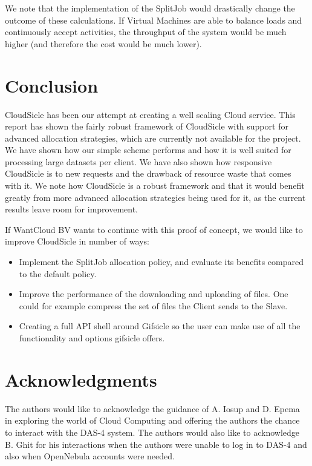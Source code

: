 \documentclass[twocolumn,twoside]{IEEEtran}
\begin{document}
We note that the implementation of the SplitJob would drastically change the
outcome of these calculations. If Virtual Machines are able to balance loads and
continuously accept activities, the throughput of the system would be much
higher (and therefore the cost would be much lower).

\section{Conclusion}
\label{sec:concl}
CloudSicle has been our attempt at creating a well scaling Cloud service.
This report has shown the fairly robust framework of CloudSicle with support
for advanced allocation strategies, which are currently not available for
the project. We have shown how our simple scheme performs and how
it is well suited for processing large datasets per client. We have also
shown how responsive CloudSicle is to new requests and the drawback of
resource waste that comes with it. We note how CloudSicle is a robust
framework and that it would benefit greatly from more advanced allocation
strategies being used for it, as the current results leave room for improvement.

If WantCloud BV wants to continue with this proof of concept, we would like to improve CloudSicle in number of ways:
\begin{itemize}
\item Implement the SplitJob allocation policy, and evaluate its benefits compared to the default policy.
\item Improve the performance of the downloading and uploading of files. One could for example compress the set of files the Client sends to the Slave.
\item Creating a full API shell around Gifsicle so the user can make use of all the functionality and options gifsicle offers.
\end{itemize}

\section*{Acknowledgments}
\noindent The authors would like to acknowledge the guidance of A. Iosup and
D. Epema in exploring the world of Cloud Computing and offering
the authors the chance to interact with the DAS-4 system.
The authors would also like to acknowledge B. Ghit for his interactions
when the authors were unable to log in to DAS-4 and also when OpenNebula
accounts were needed.
\end{document}
